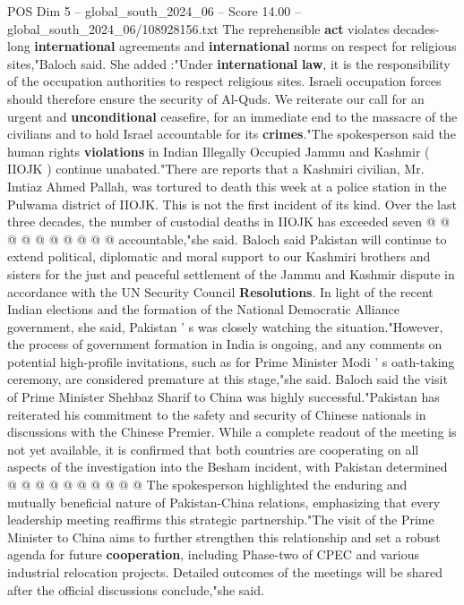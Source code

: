 \begin{textsample}{POS Dim 5 – global\_south\_2024\_06 – Score 14.00 – global\_south\_2024\_06/108928156.txt}
The reprehensible \textbf{act} violates decades-long \textbf{international} agreements and \textbf{international} norms on respect for religious sites,"Baloch said.
She added :"Under \textbf{international} \textbf{law}, it is the responsibility of the occupation authorities to respect religious sites.
Israeli occupation forces should therefore ensure the security of Al-Quds.
We reiterate our call for an urgent and \textbf{unconditional} ceasefire, for an immediate end to the massacre of the civilians and to hold Israel accountable for its \textbf{crimes}."The spokesperson said the human rights \textbf{violations} in Indian Illegally Occupied Jammu and Kashmir ( IIOJK ) continue unabated."There are reports that a Kashmiri civilian, Mr.
Imtiaz Ahmed Pallah, was tortured to death this week at a police station in the Pulwama district of IIOJK.
This is not the first incident of its kind.
Over the last three decades, the number of custodial deaths in IIOJK has exceeded seven @ @ @ @ @ @ @ @ @ @ accountable,"she said.
Baloch said Pakistan will continue to extend political, diplomatic and moral support to our Kashmiri brothers and sisters for the just and peaceful settlement of the Jammu and Kashmir dispute in accordance with the UN Security Council \textbf{Resolutions}.
In light of the recent Indian elections and the formation of the National Democratic Alliance government, she said, Pakistan ' s was closely watching the situation."However, the process of government formation in India is ongoing, and any comments on potential high-profile invitations, such as for Prime Minister Modi ' s oath-taking ceremony, are considered premature at this stage,"she said.
Baloch said the visit of Prime Minister Shehbaz Sharif to China was highly successful."Pakistan has reiterated his commitment to the safety and security of Chinese nationals in discussions with the Chinese Premier.
While a complete readout of the meeting is not yet available, it is confirmed that both countries are cooperating on all aspects of the investigation into the Besham incident, with Pakistan determined @ @ @ @ @ @ @ @ @ @ The spokesperson highlighted the enduring and mutually beneficial nature of Pakistan-China relations, emphasizing that every leadership meeting reaffirms this strategic partnership."The visit of the Prime Minister to China aims to further strengthen this relationship and set a robust agenda for future \textbf{cooperation}, including Phase-two of CPEC and various industrial relocation projects.
Detailed outcomes of the meetings will be shared after the official discussions conclude,"she said.

\end{textsample}
